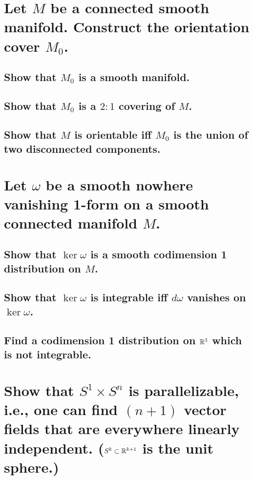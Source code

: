 \documentclass[10pt]{article}
\begin{document}
 

\section{Let $M$ be a connected smooth manifold. Construct the orientation cover $M_0$.}

\subsection{Show that $M_0$ is a smooth manifold.}

\subsection{Show that $M_0$ is a $2:1$ covering of $M$.}

\subsection{Show that $M$ is orientable iff $M_0$ is the union of two disconnected components.}

\section{Let $\omega$ be a smooth nowhere vanishing 1-form on a smooth connected manifold $M$.}

\subsection{Show that $\ker \omega$ is a smooth codimension 1 distribution on $M$.}

\subsection{Show that $\ker \omega$ is integrable iff $d\omega$ vanishes on $\ker \omega$.}

\subsection{Find a codimension 1 distribution on $\mathbb{R}^3$ which is not integrable.}

\section{Show that $S^1 \times S^n$ is parallelizable, i.e., one can find $(n+1)$ vector fields that
  are everywhere linearly independent. ($S^k \subset \mathbb{R}^{k+1}$ is the unit sphere.)}
\end{document}
